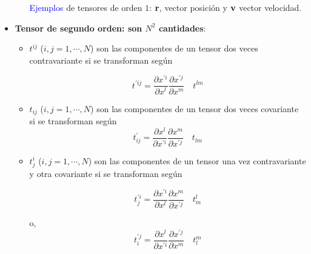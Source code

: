 \begin{itemize}
\begin{itemize}
\bigskip 

\textcolor{blue}{Ejemplos} de tensores de orden $1$: $\bold r$, vector posición y  $\bold v$ vector velocidad.

\bigskip

\end{itemize}
\item
\textbf{Tensor de segundo orden: son $N^{2}$ cantidades}:

\bigskip

\begin{itemize}
\item 

$t^{ij}$ ($i,j=1, \cdots,N$) son las componentes de un tensor  dos veces contravariante 
si se transforman según 

\bigskip


\begin{equation}
t^{\prime ij}= \frac{\partial  x^{\prime i}}{\partial   x^{l}}  \frac{\partial  x^{\prime j}}{\partial   x^{m}} \quad  t^{lm}
\end{equation}

\bigskip

\item 

$t_{ij}$ ($i,j=1, \cdots,N$) son las componentes de un tensor  dos veces covariante 
si se transforman según 
\begin{equation}
t^{\prime}_{ij}= \frac{\partial  x^{l}}{\partial   x^{\prime i}}  \frac{\partial  x^{m}}{\partial   x^{\prime j}} \quad  t_{lm}
\end{equation}

\bigskip

\item


$t^{i}_{j}$ ($i,j=1, \cdots,N$) son las componentes de un tensor  una vez contravariante   y otra covariante si se transforman según

\begin{equation}
t^{\prime i}_{j}= \frac{\partial  x^{\prime i}}{\partial   x^{l}}  \frac{\partial  x^{m}}{\partial   x^{\prime j}} \quad  t^{l}_{m}
\end{equation}

\bigskip

o, 
\begin{equation}
t^{\prime j}_{i}= \frac{\partial  x^{l}}{\partial   x^{\prime i}}  \frac{\partial  x^{\prime j}}{\partial   x^{m}} \quad  t_{l}^{m}
\end{equation}





\end{itemize}
\end{itemize}

